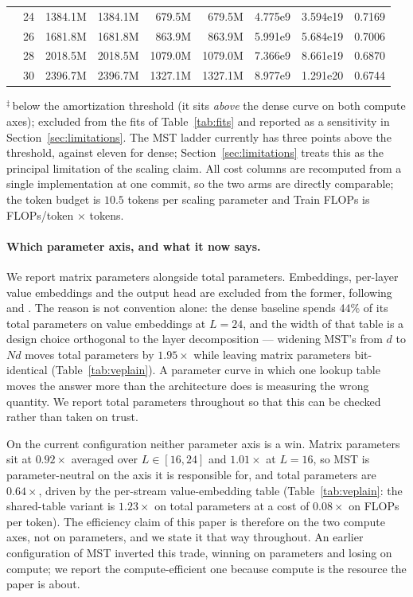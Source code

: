 \documentclass{article}
\newcommand{\dsub}{d}
\newcommand{\nsub}{N}
\begin{document}
\begin{table}[t]
\begin{center}
\begin{small}
\begin{tabular}{llrrrrrrr}
 & 24 & 1384.1M  & 1384.1M  & 679.5M   & 679.5M   & 4.775e9 & 3.594e19 & 0.7169 \\
 & 26 & 1681.8M  & 1681.8M  & 863.9M   & 863.9M   & 5.991e9 & 5.684e19 & 0.7006 \\
 & 28 & 2018.5M  & 2018.5M  & 1079.0M  & 1079.0M  & 7.366e9 & 8.661e19 & 0.6870 \\
 & 30 & 2396.7M  & 2396.7M  & 1327.1M  & 1327.1M  & 8.977e9 & 1.291e20 & 0.6744 \\
\bottomrule
\end{tabular}
\end{small}
\end{center}
$^\ddagger$\,below the amortization threshold (it sits \emph{above} the dense curve
on both compute axes); excluded from the fits of Table~\ref{tab:fits} and reported
as a sensitivity in Section~\ref{sec:limitations}. The MST ladder currently has
three points above the threshold, against eleven for dense; Section~\ref{sec:limitations}
treats this as the principal limitation of the scaling claim.
All cost columns are recomputed from a single implementation at one commit, so the
two arms are directly comparable; the token budget is $10.5$ tokens per scaling
parameter and Train FLOPs is FLOPs/token $\times$ tokens.
\end{table}

\paragraph{Which parameter axis, and what it now says.} We report matrix
parameters alongside total parameters. Embeddings, per-layer value
embeddings and the output head are excluded from the former, following
\citet{kaplan2020scaling} and \citet{hoffmann2022chinchilla}. The reason is not
convention alone: the dense baseline spends 44\% of its total parameters on value
embeddings at $L{=}24$, and the width of that table is a design choice orthogonal
to the layer decomposition --- widening MST's from $\dsub$ to $\nsub\dsub$ moves
total parameters by $1.95\times$ while leaving matrix parameters bit-identical
(Table~\ref{tab:veplain}). A parameter curve in which one lookup table moves the
answer more than the architecture does is measuring the wrong quantity. We report
total parameters throughout so that this can be checked rather than taken on
trust.

On the current configuration neither parameter axis is a win. Matrix parameters
sit at $0.92\times$ averaged over $L\!\in\![16,24]$ and $1.01\times$ at $L{=}16$,
so MST is parameter-neutral on the axis it is responsible for, and total
parameters are $0.64\times$, driven by the per-stream value-embedding table
(Table~\ref{tab:veplain}: the shared-table variant is $1.23\times$ on total
parameters at a cost of $0.08\times$ on FLOPs per token). The efficiency claim of
this paper is therefore on the two compute axes, not on parameters, and we state
it that way throughout. An earlier configuration of MST inverted this trade,
winning on parameters and losing on compute; we report the compute-efficient one
because compute is the resource the paper is about.
\end{document}
